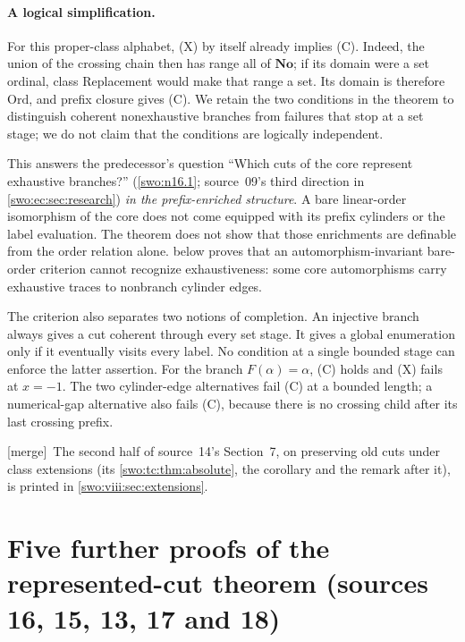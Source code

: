 \documentclass[11pt]{article}
\theoremstyle{definition}
\theoremstyle{remark}
\newcommand{\No}{\mathbf{No}}
\newcommand{\Ord}{\mathrm{Ord}}
\newcommand{\merge}{\textsf{[merge]}}
\begin{document}
\paragraph{A logical simplification.}
For this proper-class alphabet, (X) by itself already implies (C).
Indeed, the union of the crossing chain then has range all of $\No$;
if its domain were a set ordinal, class Replacement would make that
range a set. Its domain is therefore $\Ord$, and prefix closure gives
(C). We retain the two conditions in the theorem to distinguish
coherent nonexhaustive branches from failures that stop at a set stage;
we do not claim that the conditions are logically independent.

This answers the predecessor's question ``Which cuts of the core
represent exhaustive branches?'' (\cref{swo:n16.1}; source~09's third direction in \cref{swo:ec:sec:research})
\emph{in the prefix-enriched structure}. A bare linear-order isomorphism
of the core does not come equipped with its prefix cylinders or the
label evaluation. The theorem does not show that those enrichments are
definable from the order relation alone.  below proves that an automorphism-invariant
bare-order criterion cannot recognize exhaustiveness: some core
automorphisms carry exhaustive traces to nonbranch cylinder edges.

The criterion also separates two notions of completion. An injective
branch always gives a cut coherent through every set stage. It gives
a global enumeration only if it eventually visits every label. No
condition at a single bounded stage can enforce the latter assertion.
For the branch $F(\alpha)=\alpha$, (C) holds and (X) fails at $x=-1$.
The two cylinder-edge alternatives fail (C) at a bounded length; a
numerical-gap alternative also fails (C), because there is no crossing
child after its last crossing prefix.

\merge\ The second half of source~14's Section~7, on preserving old cuts
under class extensions (its \cref{swo:tc:thm:absolute}, the corollary and
the remark after it), is printed in \cref{swo:viii:sec:extensions}.

\section{Five further proofs of the represented-cut theorem (sources 16, 15, 13, 17 and 18)}\label{swo:viii:sec:routes}
\end{document}
